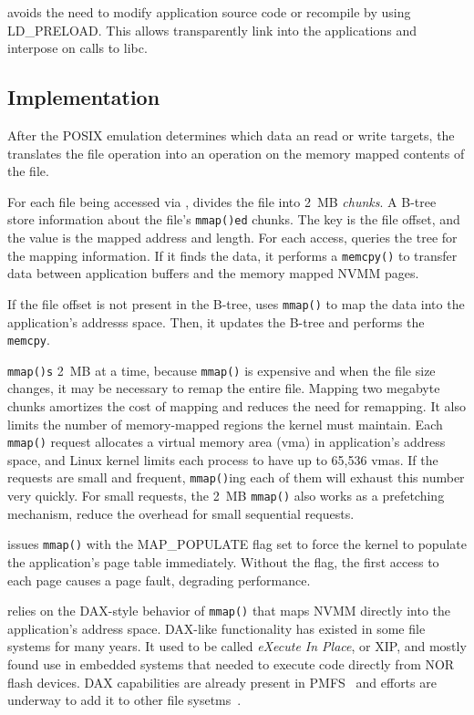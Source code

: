 \DAChell{} avoids the need to modify application source code or recompile by
using LD\_PRELOAD.  This allows \DAChell{} transparently link into the
applications and interpose on calls to libc.

\subsection{Implementation}

After the POSIX emulation determines which data an read or write targets, the
\DAChell{} translates the file operation into an operation on the memory mapped
contents of the file.

For each file being accessed via \DAChell{}, \DAChell{} divides the file into
2~MB \emph{chunks}.  A B-tree store information about the file's
\texttt{mmap()ed} chunks.  The key is the file offset, and the value is the
mapped address and length.  For each access, \DAChell{} queries the tree for
the mapping information.  If it finds the data, it performs a \texttt{memcpy()}
to transfer data between application buffers and the memory mapped NVMM pages.

If the file offset is not present in the B-tree, \DAChell{} uses
\texttt{mmap()} to map the data into the application's addresss space. Then,
it updates the B-tree and performs the \texttt{memcpy}.

\DAChell{} \texttt{mmap()s} 2~MB at a time, because \texttt{mmap()} is expensive
and when the file size changes, it may be necessary to remap the entire file. 
Mapping two megabyte chunks amortizes the cost of mapping and reduces the need
for remapping.  It also limits the number of memory-mapped regions the kernel
must maintain. Each \texttt{mmap()} request allocates a
virtual memory area (vma) in application's address space, and Linux kernel
limits each process to have up to 65,536 vmas. If the requests are small and
frequent, \texttt{mmap()}ing each of them will exhaust this number very quickly.
For small requests, the 2~MB \texttt{mmap()} also works as a prefetching
mechanism, reduce the overhead for small sequential requests.

\DAChell{} issues \texttt{mmap()} with the MAP\_POPULATE flag set to force the kernel to
populate the application's page table immediately.  Without the flag, the first
access to each page causes a page fault, degrading performance.

\DAChell{} relies on the DAX-style behavior of \texttt{mmap()} that maps NVMM
directly into the application's address space.  DAX-like functionality has
existed in some file systems for many years.  It used to be called
\emph{eXecute In Place}, or XIP, and mostly found use in embedded systems that
needed to execute
code directly from NOR flash devices.  DAX capabilities are already present in
PMFS~\cite{PMFS} and efforts are underway to add it to other file sysetms~\cite{ext4dax}.


